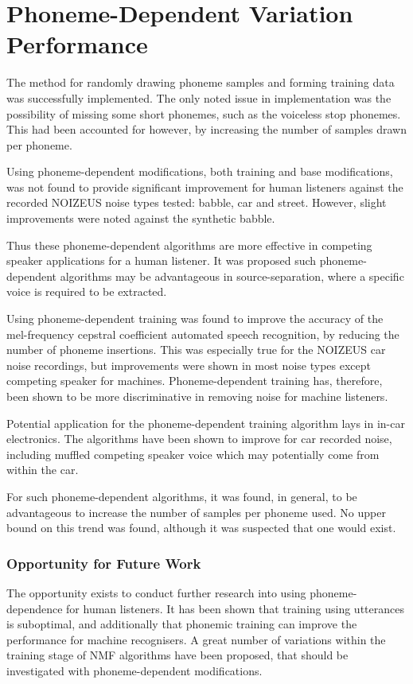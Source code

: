 \section{Phoneme-Dependent Variation Performance}

The method for randomly drawing phoneme samples and forming training
data was successfully implemented. The only noted issue in implementation
was the possibility of missing some short phonemes, such as the voiceless
stop phonemes. This had been accounted for however, by increasing
the number of samples drawn per phoneme.

Using phoneme-dependent modifications, both training and base modifications,
was not found to provide significant improvement for human listeners
against the recorded NOIZEUS noise types tested: babble, car and street.
However, slight improvements were noted against the synthetic babble.

Thus these phoneme-dependent algorithms are more effective in competing
speaker applications for a human listener. It was proposed such phoneme-dependent
algorithms may be advantageous in source-separation, where a specific
voice is required to be extracted.

Using phoneme-dependent training was found to improve the accuracy
of the mel-frequency cepstral coefficient automated speech recognition,
by reducing the number of phoneme insertions. This was especially
true for the NOIZEUS car noise recordings, but improvements were shown
in most noise types except competing speaker for machines. Phoneme-dependent
training has, therefore, been shown to be more discriminative in removing
noise for machine listeners.

Potential application for the phoneme-dependent training algorithm
lays in in-car electronics. The algorithms have been shown to improve
for car recorded noise, including muffled competing speaker voice
which may potentially come from within the car.

For such phoneme-dependent algorithms, it was found, in general, to
be advantageous to increase the number of samples per phoneme used.
No upper bound on this trend was found, although it was suspected
that one would exist.


\subsubsection*{Opportunity for Future Work}

The opportunity exists to conduct further research into using phoneme-dependence
for human listeners. It has been shown that training using utterances
is suboptimal, and additionally that phonemic training can improve
the performance for machine recognisers. A great number of variations
within the training stage of \ac{NMF} algorithms have been proposed,
that should be investigated with phoneme-dependent modifications.
